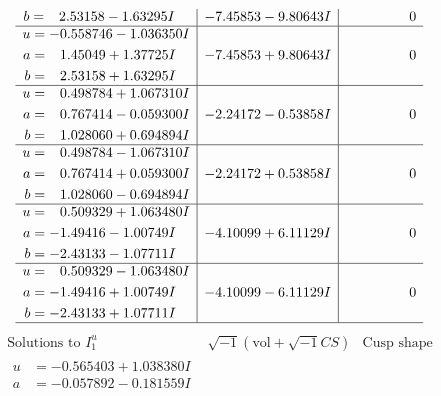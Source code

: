 \documentclass[1p]{elsarticle_modified}
\theoremstyle{definition}
\newcommand{\I}{\sqrt{-1}}
\begin{document}
$$\begin{array}{c|c|c}
\begin{aligned}
b &= \phantom{-}2.53158 - 1.63295 I\end{aligned}
 & -7.45853 - 9.80643 I & \phantom{-0.000000 } 0 \\ \hline\begin{aligned}
u &= -0.558746 - 1.036350 I \\
a &= \phantom{-}1.45049 + 1.37725 I \\
b &= \phantom{-}2.53158 + 1.63295 I\end{aligned}
 & -7.45853 + 9.80643 I & \phantom{-0.000000 } 0 \\ \hline\begin{aligned}
u &= \phantom{-}0.498784 + 1.067310 I \\
a &= \phantom{-}0.767414 - 0.059300 I \\
b &= \phantom{-}1.028060 + 0.694894 I\end{aligned}
 & -2.24172 - 0.53858 I & \phantom{-0.000000 } 0 \\ \hline\begin{aligned}
u &= \phantom{-}0.498784 - 1.067310 I \\
a &= \phantom{-}0.767414 + 0.059300 I \\
b &= \phantom{-}1.028060 - 0.694894 I\end{aligned}
 & -2.24172 + 0.53858 I & \phantom{-0.000000 } 0 \\ \hline\begin{aligned}
u &= \phantom{-}0.509329 + 1.063480 I \\
a &= -1.49416 - 1.00749 I \\
b &= -2.43133 - 1.07711 I\end{aligned}
 & -4.10099 + 6.11129 I & \phantom{-0.000000 } 0 \\ \hline\begin{aligned}
u &= \phantom{-}0.509329 - 1.063480 I \\
a &= -1.49416 + 1.00749 I \\
b &= -2.43133 + 1.07711 I\end{aligned}
 & -4.10099 - 6.11129 I & \phantom{-0.000000 } 0\\
 \hline 
 \end{array}$$\newpage$$\begin{array}{c|c|c}  
\text{Solutions to }I^u_{1}& \I (\text{vol} + \sqrt{-1}CS) & \text{Cusp shape}\\
 \hline 
\begin{aligned}
u &= -0.565403 + 1.038380 I \\
a &= -0.057892 - 0.181559 I \\

\end{aligned}
\end{array}$$
\end{document}
